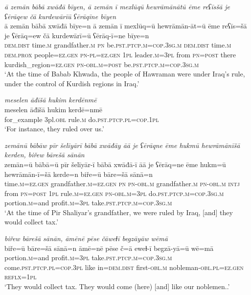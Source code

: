 \ea \label{BP.9}
\textit{ā zemān bābā xwāđā bīyen, ā zemān ī mexlūqū hewrāmānātū ēme reʕīsšā je ʕērāqew čā kurdewārīū ʕērāqīne bīyen} \\ 
\gll ā zemān bābā xwāđā bīye=n ā zemān ī mexlūq=ū hewrāmān-āt=ū ēme reʕīs=šā je ʕērāq=ew čā kurdewārī=ū ʕērāq-ī=ne bīye=n \\ 
 \textsc{dem.dist} time\textsc{.m} grandfather\textsc{.m} \textsc{pn} be\textsc{.pst}\textsc{.ptcp}\textsc{.m}\textsc{=cop}\textsc{.3sg}\textsc{.m} \textsc{dem.dist} time\textsc{.m} \textsc{dem.prox} people\textsc{=ez.gen} \textsc{pn}\textsc{\textsc{-pl}}\textsc{=ez.gen} \textsc{1pl} leader\textsc{.m}\textsc{=3pl} from \textsc{pn}\textsc{=\textsc{post}} there kurdish\_region\textsc{=ez.gen} \textsc{pn}\textsc{-obl}\textsc{.m}\textsc{=\textsc{post}} be\textsc{.pst}\textsc{.ptcp}\textsc{.m}\textsc{=cop}\textsc{.3sg}\textsc{.m} \\ 
\glt `At the time of Babab Khwada, the people of Hawraman were under Iraq’s rule, under the control of Kurdish regions in Iraq.'
\z 
 
\ea \label{BP.10}
\textit{meselen āđīšā hukim kerdēnmē} \\ 
\gll meselen āđīšā hukim kerdē=nmē \\ 
 for\_example 3pl\textsc{.obl} rule\textsc{.m} do\textsc{.pst}\textsc{.ptcp}\textsc{.pl}\textsc{=cop}\textsc{.\textsc{1pl}} \\ 
\glt `For instance, they ruled over us.'
\z 
 
\ea \label{BP.11}
\textit{zemānū bābāw pīr šelīyārī bābā xwāđāy āā je ʕērāqne ēme hukmū hewrāmānīšā kerden, biřew bārešā sānān} \\ 
\gll zemān=ū bābā=ū pīr šelīyār-ī bābā xwāđā-ī āā je ʕērāq=ne ēme hukm=ū hewrāmān-ī=šā kerde=n biře=ū bāre=šā sānā=n \\ 
 time\textsc{.m}\textsc{=ez.gen} grandfather\textsc{.m}\textsc{=ez.gen} \textsc{pn} \textsc{pn}\textsc{-obl}\textsc{.m} grandfather\textsc{.m} \textsc{pn}\textsc{-obl}\textsc{.m} \textsc{intj} from \textsc{pn}\textsc{=\textsc{post}} \textsc{1pl} rule\textsc{.m}\textsc{=ez.gen} \textsc{pn}\textsc{-obl}\textsc{.m}\textsc{=3pl} do\textsc{.pst}\textsc{.ptcp}\textsc{.m}\textsc{=cop}\textsc{.3sg}\textsc{.m} portion\textsc{.m}=and profit\textsc{.m}\textsc{=3pl} take\textsc{.pst}\textsc{.ptcp}\textsc{.m}\textsc{=cop}\textsc{.3sg}\textsc{.m} \\ 
\glt `At the time of Pir Shaliyar’s grandfather, we were ruled by Iraq, [and] they would collect tax.'
\z 
 
\ea \label{BP.12}
\textit{biřew bārešā sānān, āmēnē pēse čāweɫī begzāyāw wēmā} \\ 
\gll biře=ū bāre=šā sānā=n āmē=nē pēse č=ā eweɫ-ī begzā-yā=ū wē=mā \\ 
 portion\textsc{.m}=and profit\textsc{.m}\textsc{=3pl} take\textsc{.pst}\textsc{.ptcp}\textsc{.m}\textsc{=cop}\textsc{.3sg}\textsc{.m} come\textsc{.pst}\textsc{.ptcp}\textsc{.pl}\textsc{=cop}\textsc{.3pl} like in=\textsc{dem.dist} first\textsc{-obl}\textsc{.m} nobleman\textsc{-obl}\textsc{.pl}\textsc{=ez.gen} \textsc{reflx}\textsc{=\textsc{1pl}} \\ 
\glt `They would collect tax. They would come (here) [and] like our noblemen..'
\z 
 
